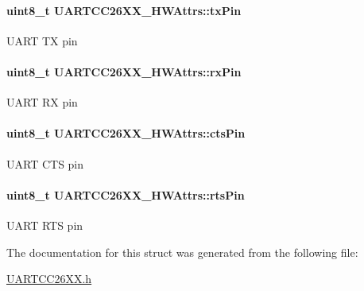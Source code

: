 \paragraph[{tx\-Pin}]{\setlength{\rightskip}{0pt plus 5cm}uint8\-\_\-t U\-A\-R\-T\-C\-C26\-X\-X\-\_\-\-H\-W\-Attrs\-::tx\-Pin}\label{struct_u_a_r_t_c_c26_x_x___h_w_attrs_abe8dcea54ebbdebdaae1504908a96b95}
U\-A\-R\-T T\-X pin 
\paragraph[{rx\-Pin}]{\setlength{\rightskip}{0pt plus 5cm}uint8\-\_\-t U\-A\-R\-T\-C\-C26\-X\-X\-\_\-\-H\-W\-Attrs\-::rx\-Pin}\label{struct_u_a_r_t_c_c26_x_x___h_w_attrs_a45fd697b8735c682ce7d12af6348d229}
U\-A\-R\-T R\-X pin 
\paragraph[{cts\-Pin}]{\setlength{\rightskip}{0pt plus 5cm}uint8\-\_\-t U\-A\-R\-T\-C\-C26\-X\-X\-\_\-\-H\-W\-Attrs\-::cts\-Pin}\label{struct_u_a_r_t_c_c26_x_x___h_w_attrs_a03d0531a1fdcf84206163376c6eefaba}
U\-A\-R\-T C\-T\-S pin 
\paragraph[{rts\-Pin}]{\setlength{\rightskip}{0pt plus 5cm}uint8\-\_\-t U\-A\-R\-T\-C\-C26\-X\-X\-\_\-\-H\-W\-Attrs\-::rts\-Pin}\label{struct_u_a_r_t_c_c26_x_x___h_w_attrs_a1a9efb86deefbf00c440787513fc8d96}
U\-A\-R\-T R\-T\-S pin 

The documentation for this struct was generated from the following file\-:\begin{DoxyCompactItemize}
\item 
\hyperlink{_u_a_r_t_c_c26_x_x_8h}{U\-A\-R\-T\-C\-C26\-X\-X.\-h}\end{DoxyCompactItemize}
